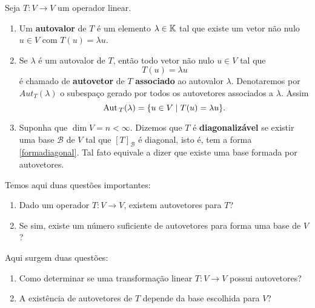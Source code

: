 \documentclass{beamer}
\begin{document}
    \begin{frame}
    \begin{definicao}
        Seja $T : V \to V$ um operador linear.
        \begin{enumerate}[label={\roman*})]
            \item Um \textbf{autovalor} de $T$ é um elemento $\lambda \in \mathbb{K}$ tal que existe um vetor não nulo $u \in V$ com $T(u) = \lambda u$.
            \item Se $\lambda$ é um autovalor de $T$, então todo vetor não nulo $u \in V$ tal que
            \[
            T(u) = \lambda u
            \]
            é chamado de \textbf{autovetor} de $T$ \textbf{associado} ao autovalor $\lambda$. Denotaremos por $Aut_T(\lambda)$ o subespaço gerado por todos os autovetores associados a $\lambda$. Assim
            \[
            {\rm Aut\,}_T(\lambda) = \{u \in V \mid T(u) = \lambda u\}.
            \]
            \item Suponha que $\dim V = n < \infty$. Dizemos que $T$ é \textbf{diagonalizável} se existir uma base $\mathcal{B}$ de $V$ tal que $[T]_\mathcal{B}$ é diagonal, isto é, tem a forma \eqref{formadiagonal}. Tal fato equivale a dizer que existe uma base formada por autovetores.
        \end{enumerate}
    \end{definicao}
    \end{frame}

    \begin{frame}
        Temos aqui duas questões importantes:
        \begin{enumerate}[label={\arabic*})]
            \item Dado um operador $T \colon V \to V$, existem autovetores para $T$?

            \item Se sim, existe um número suficiente de autovetores para forma uma base de $V$?
        \end{enumerate}
    \end{frame}

    \begin{frame}
        Aqui surgem duas questões:
        \begin{enumerate}[label={\arabic*})]
            \item Como determinar se uma transformação linear $T \colon V \to V$ possui autovetores?

            \item A existência de autovetores de $T$ depende da base escolhida para $V$?
        \end{enumerate}
    \end{frame}
\end{document}
